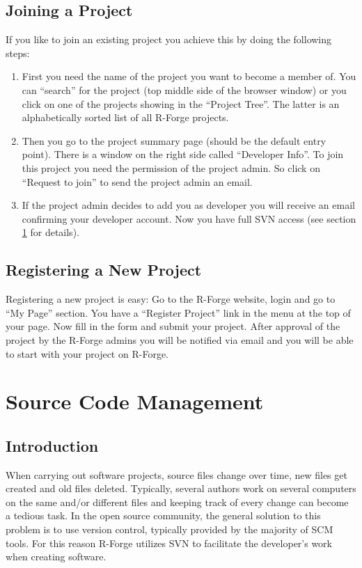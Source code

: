 \documentclass[a4paper]{article}
\newcommand{\proglang}[1]{\textsf{#1}}
\begin{document}
\subsection{Joining a Project}
\label{sec:joinproject}
If you like to join an existing project you achieve this by doing the
following steps:
\begin{enumerate}
\item First you need the name of the project you want to become a
  member of. You can ``search'' for the project (top middle side of the
  browser window) or you click on one of the projects showing in the
  ``Project Tree''. The latter is an alphabetically sorted list of all
  \proglang{R}-Forge projects.
\item Then you go to the project summary page (should be the default
  entry point). There is a window on the right side called
  ``Developer Info''. To join this project you need the permission of
  the project admin. So click on ``Request to join'' to send the
  project admin an email.
\item If the project admin decides to add you as developer you will
  receive an email confirming your developer account. Now you have
  full SVN access (see section \ref{sec:scm} for details).
\end{enumerate}

\subsection{Registering a New Project}
\label{sec:newproject}

Registering a new project is easy: Go to the \proglang{R}-Forge website, login and
go to ``My Page'' section. You have a ``Register Project'' link in the
menu at the top of your page. Now fill in the form and submit your
project. After approval of the project by the \proglang{R}-Forge admins  you will
be notified via email and you will be able to start with your project
on \proglang{R}-Forge.

\section{Source Code Management}
\label{sec:scm}

\subsection{Introduction}

When carrying out software projects, source files change over time,
new files get created and old files deleted. Typically, several authors
work on several computers on the same and/or different files and keeping
track of every change can become a tedious task. In the open source
community, the general solution to this problem is to use version
control, typically provided by the majority of SCM tools. For this
reason \proglang{R}-Forge utilizes SVN to facilitate the developer's
work when creating software.
\end{document}
